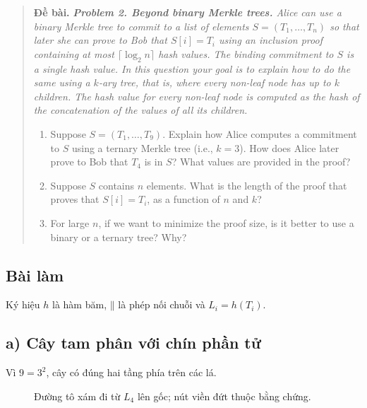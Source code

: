 \documentclass[12pt,a4paper]{article}
\newenvironment{summarybox}
  {\begin{quote}\footnotesize\color{darkgray}\textbf{Đề bài.}\;\itshape}
  {\end{quote}}
\newcommand{\solution}{\subsection*{Bài làm}}
\newcommand{\concat}{\mathbin{\|}}
\begin{document}
\begin{summarybox}
\textbf{Problem 2. Beyond binary Merkle trees.}
Alice can use a binary Merkle tree to commit to a list of elements
$S=(T_1,\ldots,T_n)$ so that later she can prove to Bob that $S[i]=T_i$ using
an inclusion proof containing at most $\lceil\log_2 n\rceil$ hash values. The
binding commitment to $S$ is a single hash value. In this question your goal
is to explain how to do the same using a $k$-ary tree, that is, where every
non-leaf node has up to $k$ children. The hash value for every non-leaf node
is computed as the hash of the concatenation of the values of all its
children.

\begin{enumerate}[label=\alph*.,leftmargin=1.5em]
  \item Suppose $S=(T_1,\ldots,T_9)$. Explain how Alice computes a commitment
        to $S$ using a ternary Merkle tree (i.e., $k=3$). How does Alice later
        prove to Bob that $T_4$ is in $S$? What values are provided in the
        proof?
  \item Suppose $S$ contains $n$ elements. What is the length of the proof
        that proves that $S[i]=T_i$, as a function of $n$ and $k$?
  \item For large $n$, if we want to minimize the proof size, is it better to
        use a binary or a ternary tree? Why?
\end{enumerate}
\end{summarybox}

\solution

Ký hiệu $h$ là hàm băm, $\concat$ là phép nối chuỗi và $L_i=h(T_i)$.

\subsection*{a) Cây tam phân với chín phần tử}

Vì $9=3^2$, cây có đúng hai tầng phía trên các lá.

\begin{figure}[h]
\centering
{}
\caption{Đường tô xám đi từ $L_4$ lên gốc; nút viền đứt thuộc bằng chứng.}
\end{figure}
\end{document}
